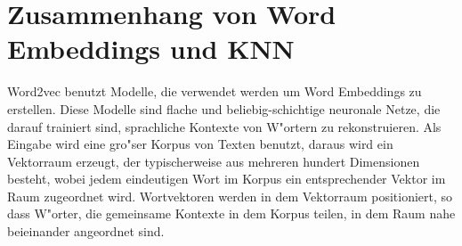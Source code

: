 \section{Zusammenhang von Word Embeddings und \acs{KNN}}
Word2vec benutzt Modelle, die verwendet werden um Word Embeddings zu erstellen. Diese Modelle sind flache und beliebig-schichtige neuronale Netze, die darauf trainiert sind, sprachliche Kontexte von W"ortern zu rekonstruieren. Als Eingabe wird eine gro"ser Korpus von Texten benutzt, daraus wird ein Vektorraum erzeugt, der typischerweise aus mehreren hundert Dimensionen besteht, wobei jedem eindeutigen Wort im Korpus ein entsprechender Vektor im Raum zugeordnet wird. Wortvektoren werden in dem Vektorraum positioniert, so dass W"orter, die gemeinsame Kontexte in dem Korpus teilen, in dem Raum nahe beieinander angeordnet sind.
